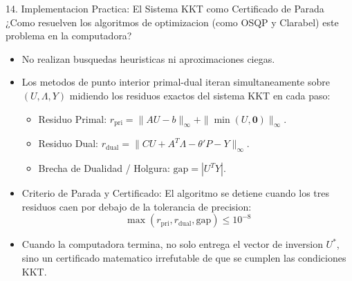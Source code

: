 \documentclass[aspectratio=169,10pt]{beamer}
\begin{document}
\begin{frame}{14. Implementacion Practica: El Sistema KKT como Certificado de Parada}
  ¿Como resuelven los algoritmos de optimizacion (como OSQP y Clarabel) este problema en la computadora?
  \vspace{0.2cm}
  \begin{itemize}
    \item No realizan busquedas heuristicas ni aproximaciones ciegas.
    \vspace{0.1cm}
    \item Los metodos de punto interior primal-dual iteran simultaneamente sobre $(U, \Lambda, Y)$ midiendo los residuos exactos del sistema KKT en cada paso:
    \begin{itemize}
      \item Residuo Primal: $r_{\mathrm{pri}} = \|A U - b\|_\infty + \|\min(U, \mathbf{0})\|_\infty$.
      \item Residuo Dual: $r_{\mathrm{dual}} = \|C U + A^T \Lambda - \theta' P - Y\|_\infty$.
      \item Brecha de Dualidad / Holgura: $\mathrm{gap} = |U^T Y|$.
    \end{itemize}
    \vspace{0.2cm}
    \item Criterio de Parada y Certificado:
    El algoritmo se detiene cuando los tres residuos caen por debajo de la tolerancia de precision:
    \begin{equation*}
      \max(r_{\mathrm{pri}}, r_{\mathrm{dual}}, \mathrm{gap}) \le 10^{-8}
    \end{equation*}
    \item Cuando la computadora termina, no solo entrega el vector de inversion $U^*$, sino un certificado matematico irrefutable de que se cumplen las condiciones KKT.
  \end{itemize}
\end{frame}
\end{document}
